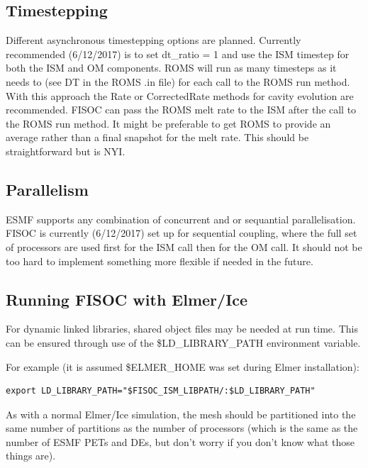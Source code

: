\documentclass[12pt]{article}
\begin{document}
\subsection{Timestepping}

Different asynchronous timestepping options are planned.
Currently recommended (6/12/2017) is to set dt\_ratio = 1 and use the 
ISM timestep for both the ISM and OM components. 
ROMS will run as many timesteps as it needs to (see DT in the ROMS .in file) 
for each call to the ROMS run method. 
With this approach the Rate or CorrectedRate methods for cavity evolution 
are recommended. 
FISOC can pass the ROMS melt rate to the ISM after the call to the 
ROMS run method. 
It might be preferable to get ROMS to provide an average rather than a final 
snapshot for the melt rate. This should be straightforward but is NYI.





\subsection{Parallelism}

ESMF supports any combination of concurrent and or sequantial parallelisation. 
FISOC is currently (6/12/2017) set up for sequential coupling, where the 
full set of processors are used first for the ISM call then for the OM call. 
It should not be too hard to implement something more flexible if needed 
in the future.



\subsection{Running FISOC with Elmer/Ice} 
For dynamic linked libraries, shared object files may be needed at run time.  
This can be ensured through use of 
the \$LD\_LIBRARY\_PATH environment variable. 

For example (it is assumed \$ELMER\_HOME was set during Elmer installation):
\begin{lstlisting}
export LD_LIBRARY_PATH="$FISOC_ISM_LIBPATH/:$LD_LIBRARY_PATH"
\end{lstlisting}

As with a normal Elmer/Ice simulation, the mesh should be partitioned into the 
same number of partitions as the number of processors (which is the same as the number of 
ESMF PETs and DEs, but don't worry if you don't know what those things are). 
\end{document}
